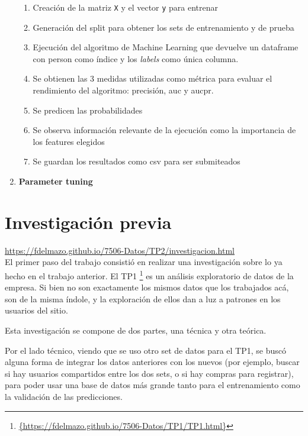 \documentclass[a4paper]{article}
\begin{document}
\begin{enumerate}
\begin{enumerate}
	\item Creación de la matriz \texttt{X} y el vector \texttt{y} para entrenar
	\item Generación del split para obtener los sets de entrenamiento y de prueba
	\item Ejecución del algoritmo de Machine Learning que devuelve un dataframe con person como índice y los \textit{labels} como única columna.
	\item Se obtienen las 3 medidas utilizadas como métrica para evaluar el rendimiento del algoritmo: precisión, auc y aucpr.
	\item Se predicen las probabilidades 
	\item Se observa información relevante de la ejecución como la importancia de los features elegidos
	\item Se guardan los resultados como csv para ser submiteados
	
\end{enumerate}

\item \textbf{Parameter tuning}

\end{enumerate}

\section{Investigación previa}

\url{https://fdelmazo.github.io/7506-Datos/TP2/investigacion.html} \\

El primer paso del trabajo consistió en realizar una investigación sobre lo ya hecho en el trabajo anterior. El TP1 \footnote{\url{{https://fdelmazo.github.io/7506-Datos/TP1/TP1.html}}} es un análisis exploratorio de datos de la empresa. Si bien no son exactamente los mismos datos que los trabajados acá, son de la misma índole, y la exploración de ellos dan a luz a patrones en los usuarios del sitio.

Esta investigación se compone de dos partes, una técnica y otra teórica.

Por el lado técnico, viendo que se uso otro set de datos para el TP1, se buscó alguna forma de integrar los datos anteriores con los nuevos (por ejemplo, buscar si hay usuarios compartidos entre los dos sets, o si hay compras para registrar), para poder usar una base de datos más grande tanto para el entrenamiento como la validación de las predicciones. 
\end{document}
